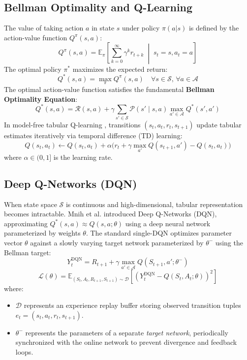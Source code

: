 \subsection{Bellman Optimality and Q-Learning}
The value of taking action $a$ in state $s$ under policy $\pi(a|s)$ is defined by the action-value function $Q^\pi(s, a)$:
\begin{equation}
    Q^\pi(s, a) = \mathbb{E}_\pi \left[ \sum_{k=0}^\infty \gamma^k r_{t+k} \;\middle|\; s_t = s, a_t = a \right]
\end{equation}
The optimal policy $\pi^*$ maximizes the expected return:
\begin{equation}
    Q^*(s, a) = \max_\pi Q^\pi(s, a) \quad \forall s \in \mathcal{S}, \, \forall a \in \mathcal{A}
\end{equation}
The optimal action-value function satisfies the fundamental \textbf{Bellman Optimality Equation}:
\begin{equation}
    Q^*(s, a) = \mathcal{R}(s, a) + \gamma \sum_{s' \in \mathcal{S}} \mathcal{P}(s' \mid s, a) \max_{a' \in \mathcal{A}} Q^*(s', a')
    \label{eq:bellman_optimality}
\end{equation}
In model-free tabular Q-learning \cite{sutton2018reinforcement}, transitions $(s_t, a_t, r_t, s_{t+1})$ update tabular estimates iteratively via temporal difference (TD) learning:
\begin{equation}
    Q(s_t, a_t) \gets Q(s_t, a_t) + \alpha \Big( r_t + \gamma \max_{a'} Q(s_{t+1}, a') - Q(s_t, a_t) \Big)
\end{equation}
where $\alpha \in (0, 1]$ is the learning rate.

\subsection{Deep Q-Networks (DQN)}
When state space $\mathcal{S}$ is continuous and high-dimensional, tabular representation becomes intractable. Mnih et al. \cite{mnih2015human} introduced Deep Q-Networks (DQN), approximating $Q^*(s, a) \approx Q(s, a; \theta)$ using a deep neural network parameterized by weights $\theta$. The standard single-DQN optimizes parameter vector $\theta$ against a slowly varying target network parameterized by $\theta^-$ using the Bellman target:
\begin{equation}
    Y_t^{\text{DQN}} = R_{t+1} + \gamma \max_{a' \in \mathcal{A}} Q(S_{t+1}, a'; \theta^-)
    \label{eq:standard_dqn_target}
\end{equation}
\begin{equation}
    \mathcal{L}(\theta) = \mathbb{E}_{(S_t, A_t, R_{t+1}, S_{t+1}) \sim \mathcal{D}} \left[ \left( Y_t^{\text{DQN}} - Q(S_t, A_t; \theta) \right)^2 \right]
\end{equation}
where:
\begin{itemize}
    \item $\mathcal{D}$ represents an experience replay buffer storing observed transition tuples $e_t = (s_t, a_t, r_t, s_{t+1})$.
    \item $\theta^-$ represents the parameters of a separate \emph{target network}, periodically synchronized with the online network to prevent divergence and feedback loops.
\end{itemize}

